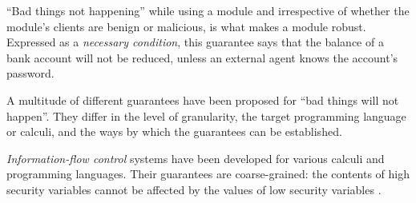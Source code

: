   \vspace{.03in}
 ``Bad things not happening'' while using a module and irrespective of whether the module's
 clients are benign or malicious, is what makes a module  robust. 
Expressed as a \emph{necessary condition}, this guarantee says that the 
balance of a bank account will not be reduced, unless an external agent knows
the account's password.
%
 
 
A multitude of different guarantees have been proposed for ``bad things  will
not happen''. They differ  in the level of granularity, 
the target programming language or calculi, and the ways by which 
the guarantees can be established.
 
 

\emph{Information-flow control}  systems have been developed for
various calculi and programming languages. Their 
 guarantees are coarse-grained:  the contents of high security variables cannot
be affected by the values of low security variables 
\cite{Zdancewic:Myers:01,noninteferenceOS}. 
 
